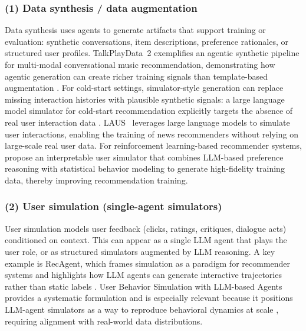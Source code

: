 \subsubsection{\textbf{(1) Data synthesis / data augmentation}}\label{subsubsec:simulation-data-synthesis}
Data synthesis uses agents to generate artifacts that support training or evaluation: synthetic conversations, item descriptions, preference rationales, or structured user profiles.
TalkPlayData~2 exemplifies an agentic synthetic pipeline for multi-modal conversational music recommendation, demonstrating how agentic generation can create richer training signals than template-based augmentation \cite{choi2025talkplaydata}. 
For cold-start settings, simulator-style generation can replace missing interaction histories with plausible synthetic signals: a large language model simulator for cold-start recommendation explicitly targets the absence of real user interaction data \cite{huang2025large}.  
LAUS~\cite{park2025llm} leverages large language models to simulate user interactions, enabling the training of news recommenders without relying on large-scale real user data.
For reinforcement learning-based recommender systems, \citet{zhang2025llm} propose an interpretable user simulator that combines LLM-based preference reasoning with statistical behavior modeling to generate high-fidelity training data, thereby improving recommendation training.






\subsubsection{\textbf{(2) User simulation (single-agent simulators)}}\label{subsubsec:simulation-single-agent-simulator}
User simulation models user feedback (clicks, ratings, critiques, dialogue acts) conditioned on context.
This can appear as a single LLM agent that plays the user role, or as structured simulators augmented by LLM reasoning. 
A key example is RecAgent, which frames simulation as a paradigm for recommender systems and highlights how LLM agents can generate interactive trajectories rather than static labels \cite{wang2023recagent}.
User Behavior Simulation with LLM-based Agents provides a systematic formulation and is especially relevant because it positions LLM-agent simulators as a way to reproduce behavioral dynamics at scale \cite{wang2025user}, requiring alignment with real-world data distributions. 


